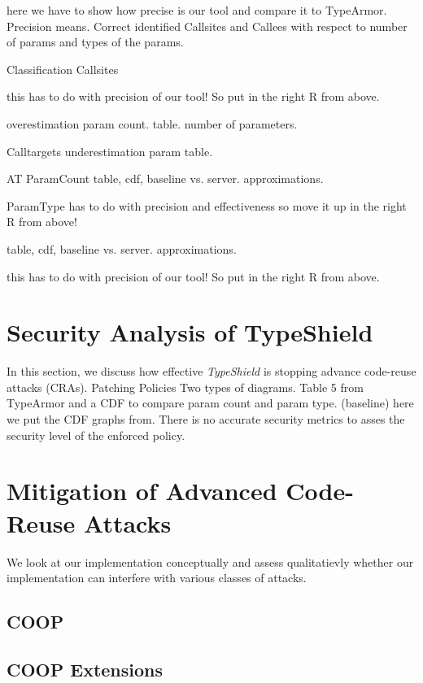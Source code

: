 here we have to show how precise is our tool and compare it to TypeArmor.
Precision means. Correct identified Callsites and Callees with respect to number of params and types of the params.

Classification
Callsites

this has to do with precision of our tool! So put in the right R from above.

overestimation param count. table.
number of parameters.

Calltargets
underestimation param table.

AT
ParamCount
table, cdf, baseline vs. server. approximations.

ParamType
has to do with precision and effectiveness so move it up in the right R from above!

table, cdf, baseline vs. server. approximations.


this has to do with precision of our tool! So put in the right R from above.


\section{Security Analysis of TypeShield}
\label{section:typeshieldsecurityanalysis}

In this section, we discuss how effective \textit{TypeShield} is 
stopping advance code-reuse attacks (CRAs).
Patching Policies
Two types of diagrams. Table 5 from TypeArmor and a CDF to compare param count and param type. (baseline)
here we put the CDF graphs from. There is no accurate security metrics to asses the security level of the enforced policy.




\section{Mitigation of Advanced Code-Reuse Attacks}
\label{section:mitiagtion}
We look at our implementation conceptually and assess qualitatievly whether our implementation can interfere with various classes of attacks. 

\subsection{COOP}
\label{Effectiveness against COOP}

\subsection{COOP Extensions}
\label{COOP Extensions}

